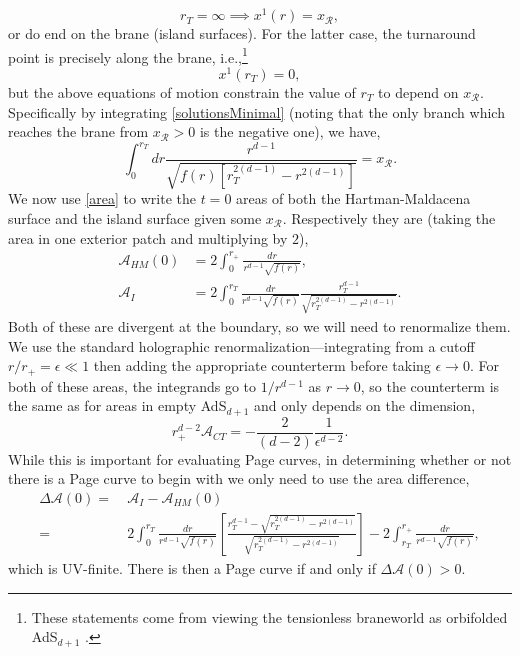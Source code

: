 \documentclass[12pt,a4paper]{article}
\begin{document}
\begin{equation}
r_T = \infty \implies x^1(r) = x_\mathcal{R},
\end{equation}
or do end on the brane (island surfaces). For the latter case, the turnaround point is precisely along the brane, i.e.,\footnote{These statements come from viewing the tensionless braneworld as orbifolded AdS$_{d+1}$ \cite{Shashi:2020mkd,Geng:2020qvw}.}
\begin{equation}
x^1(r_T) = 0,
\end{equation}
but the above equations of motion constrain the value of $r_T$ to depend on $x_\mathcal{R}$. Specifically by integrating \eqref{solutionsMinimal} (noting that the only branch which reaches the brane from $x_\mathcal{R} > 0$ is the negative one), we have,
\begin{equation}
\int_0^{r_T}dr \frac{r^{d-1}}{\sqrt{f(r)\left[r_T^{2(d-1)} - r^{2(d-1)}\right]}} = x_\mathcal{R}.\label{radEnd}
\end{equation}
We now use \eqref{area} to write the $t = 0$ areas of both the Hartman-Maldacena surface and the island surface given some $x_\mathcal{R}$. Respectively they are (taking the area in one exterior patch and multiplying by $2$),
\begin{align}
\mathcal{A}_{HM}(0) &= 2\int_0^{r_+} \frac{dr}{r^{d-1}\sqrt{f(r)}},\label{hm0}\\
\mathcal{A}_I &= 2\int_0^{r_T} \frac{dr}{r^{d-1}\sqrt{f(r)}} \frac{r_T^{d-1}}{\sqrt{r_T^{2(d-1)} - r^{2(d-1)}}}.
\end{align}
Both of these are divergent at the boundary, so we will need to renormalize them. We use the standard holographic renormalization---integrating from a cutoff $r/r_+ = \epsilon \ll 1$ then adding the appropriate counterterm before taking $\epsilon \to 0$. For both of these areas, the integrands go to $1/r^{d-1}$ as $r \to 0$, so the counterterm is the same as for areas in empty AdS$_{d+1}$ and only depends on the dimension,
\begin{equation}
r_+^{d-2} \mathcal{A}_{CT} = -\dfrac{2}{(d-2)}\dfrac{1}{\epsilon^{d-2}}.\label{areaCT}
\end{equation}
While this is important for evaluating Page curves, in determining whether or not there is a Page curve to begin with we only need to use the area difference,
\begin{equation}
\begin{split}
\Delta\mathcal{A}(0)
=\ &\mathcal{A}_I - \mathcal{A}_{HM}(0)\\
=\ &2\int_0^{r_T} \frac{dr}{r^{d-1}\sqrt{f(r)}} \left[\frac{r_T^{d-1} - \sqrt{r_{T}^{2(d-1)} - r^{2(d-1)}}}{\sqrt{r_T^{2(d-1)} - r^{2(d-1)}}}\right] -2\int_{r_T}^{r_+} \frac{dr}{r^{d-1}\sqrt{f(r)}},
\end{split}\label{areaDiff}
\end{equation}
which is UV-finite. There is then a Page curve if and only if $\Delta\mathcal{A}(0) > 0$.
\end{document}
